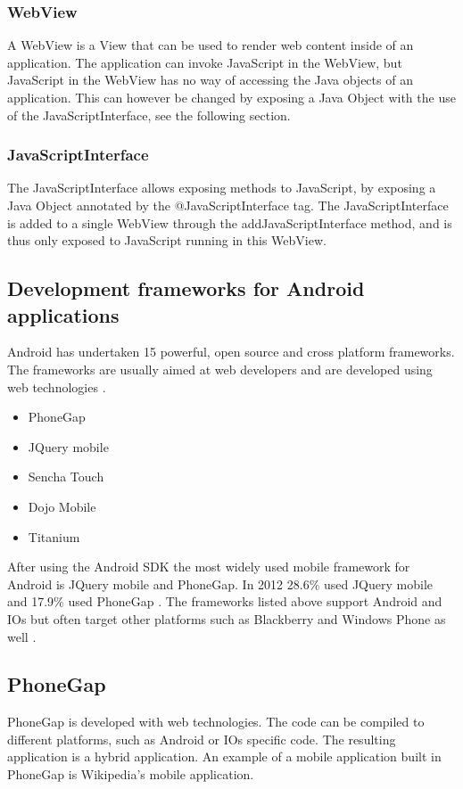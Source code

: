 \subsubsection{WebView}\label{subsubsec:webview}
A WebView \cite{webview2015} is a View \cite{view2015} that can be used to render web content inside of an application. The application can invoke JavaScript in the WebView, but JavaScript in the WebView has no way of accessing the Java objects of an application. This can however be changed by exposing a Java Object with the use of the JavaScriptInterface, see the following section.

\subsubsection{JavaScriptInterface}\label{subsubsec:javascriptinterface}
The JavaScriptInterface \cite{jsi2015} allows exposing methods to JavaScript, by exposing a Java Object annotated by the @JavaScriptInterface tag. The JavaScriptInterface is added to a single WebView through the addJavaScriptInterface method, and is thus only exposed to JavaScript running in this WebView.

\subsection{Development frameworks for Android applications}\label{subsec:development-frameworks-for-android-applications}
Android has undertaken 15 powerful, open source and cross platform frameworks. The frameworks are usually aimed at web developers and are developed using web technologies \cite{mondal2013}.

\begin{itemize}
\item PhoneGap
\item JQuery mobile
\item Sencha Touch
\item Dojo Mobile
\item Titanium
\end{itemize}

After using the Android SDK the most widely used mobile framework for Android is JQuery mobile and PhoneGap. In 2012 28.6\% used JQuery mobile and 17.9\% used PhoneGap \cite{eclipse2012}. The frameworks listed above support Android and IOs but often target other platforms such as Blackberry and Windows Phone as well \cite{mondal2013}. 

\subsection{PhoneGap} \label{subsec:phonegap}
PhoneGap is developed with web technologies. The code can be compiled to different platforms, such as Android or IOs specific code. The resulting application is a hybrid application. An example of a mobile application built in PhoneGap is Wikipedia's mobile application.

